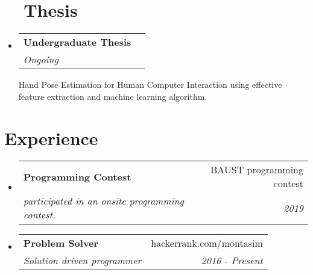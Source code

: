 \documentclass[a4paper,20pt]{article}
\makeatletter
\newcommand{\resumeItem}[2]{
  \item\small{
    \textbf{#1}{: #2 \vspace{-2pt}}
  }
}
\newcommand{\resumeSubheading}[4]{
  \vspace{-1pt}\item
    \begin{tabular*}{0.97\textwidth}{l@{\extracolsep{\fill}}r}
      \textbf{#1} & #2 \\
      \textit{#3} & \textit{#4} \\
    \end{tabular*}\vspace{-5pt}
}
\newcommand{\resumeSubItem}[2]{\resumeItem{#1}{#2}\vspace{-3pt}}
\newcommand{\resumeSubHeadingListStart}{\begin{itemize}[leftmargin=*]}
\newcommand{\resumeSubHeadingListEnd}{\end{itemize}}
\makeatother
\begin{document}
\vspace{5pt}

\section{~~Thesis}
  \resumeSubHeadingListStart
    \resumeSubheading
      {Undergraduate Thesis}{} 
      {Ongoing}{} 
      \hfill \break
      { Hand Pose Estimation for Human Computer Interaction using effective feature extraction and machine learning algorithm.}
    \resumeSubHeadingListEnd
    
\vspace{5pt}

\begin{comment}
\section{Publications}
\resumeSubHeadingListStart
\resumeSubItem{Book: Deep Learning on Web (Web Development, Deep Learning)}{Work in Progress book to be published by Packt Publishing in late 2019. Tech: Django, Python, AWS, GCP, Azure (November '18)}

\vspace{2pt}

\resumeSubItem{Book: Deep Learning on Mobile Devices (Flutter App Development, Deep Learning)}{Work in Progress book to be published by Packt Publishing in late 2019. Tech: Flutter, Android, Firebase, TensorFlow, Python, Dart (December '18)}
\resumeSubHeadingListEnd
    
\vspace{5pt}
\end{comment}

\section{Experience}
  \resumeSubHeadingListStart
    \resumeSubheading{Programming Contest}{BAUST programming contest}
    {participated in an onsite programming contest.}{2019}
      
\vspace{5pt}

    \resumeSubheading
		{Problem Solver}{hackerrank.com/montasim}
		{Solution driven programmer}{2016 -  Present}

\resumeSubHeadingListEnd

\vspace{5pt}
\end{document}
